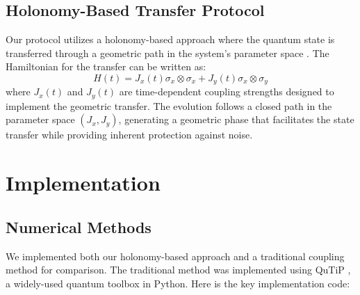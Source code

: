 \documentclass[12pt]{article}
\begin{document}
\subsection{Holonomy-Based Transfer Protocol}
Our protocol utilizes a holonomy-based approach where the quantum state is transferred through a geometric path in the system's parameter space \cite{zanardi1999holonomic}. The Hamiltonian for the transfer can be written as:
\begin{equation}
H(t) = J_x(t)\sigma_x \otimes \sigma_x + J_y(t)\sigma_x \otimes \sigma_y
\end{equation}
where $J_x(t)$ and $J_y(t)$ are time-dependent coupling strengths designed to implement the geometric transfer. The evolution follows a closed path in the parameter space $(J_x, J_y)$, generating a geometric phase that facilitates the state transfer while providing inherent protection against noise.

\section{Implementation}
\subsection{Numerical Methods}
We implemented both our holonomy-based approach and a traditional coupling method for comparison. The traditional method was implemented using QuTiP \cite{qutip2013}, a widely-used quantum toolbox in Python. Here is the key implementation code:
\end{document}
